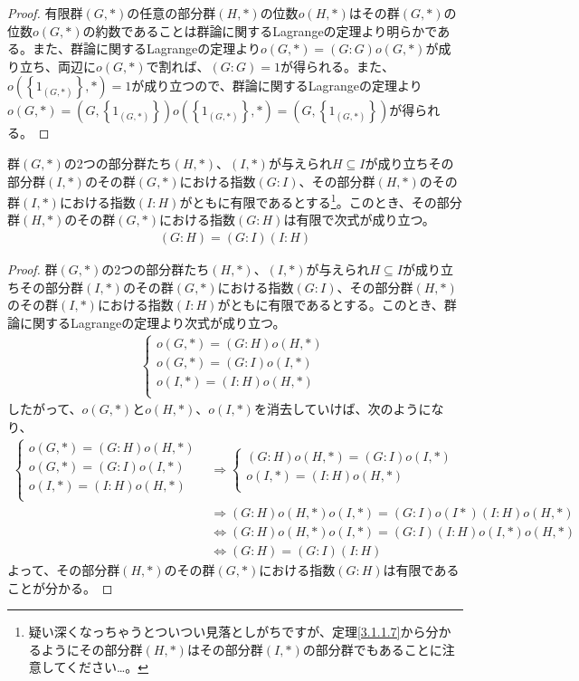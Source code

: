 \documentclass[dvipdfmx]{jsarticle}
\begin{document}
\begin{proof}
有限群$(G,*)$の任意の部分群$(H,*)$の位数$o(H,*)$はその群$(G,*)$の位数$o(G,*)$の約数であることは群論に関するLagrangeの定理より明らかである。また、群論に関するLagrangeの定理より$o(G,*) = (G:G)o(G,*)$が成り立ち、両辺に$o(G,*)$で割れば、$(G:G) = 1$が得られる。また、$o\left( \left\{ 1_{(G,*)} \right\},* \right) = 1$が成り立つので、群論に関するLagrangeの定理より$o(G,*) = \left( G,\left\{ 1_{(G,*)} \right\} \right)o\left( \left\{ 1_{(G,*)} \right\},* \right) = \left( G,\left\{ 1_{(G,*)} \right\} \right)$が得られる。
\end{proof}
\begin{thm}\label{3.1.1.36}
群$(G,*)$の2つの部分群たち$(H,*)$、$(I,*)$が与えられ$H \subseteq I$が成り立ちその部分群$(I,*)$のその群$(G,*)$における指数$(G:I)$、その部分群$(H,*)$のその群$(I,*)$における指数$(I:H)$がともに有限であるとする\footnote{疑い深くなっちゃうとついつい見落としがちですが、定理\ref{3.1.1.7}から分かるようにその部分群$(H,*)$はその部分群$(I,*)$の部分群でもあることに注意してください…。}。このとき、その部分群$(H,*)$のその群$(G,*)$における指数$(G:H)$は有限で次式が成り立つ。
\begin{align*}
(G:H) = (G:I)(I:H)
\end{align*}
\end{thm}
\begin{proof}
群$(G,*)$の2つの部分群たち$(H,*)$、$(I,*)$が与えられ$H \subseteq I$が成り立ちその部分群$(I,*)$のその群$(G,*)$における指数$(G:I)$、その部分群$(H,*)$のその群$(I,*)$における指数$(I:H)$がともに有限であるとする。このとき、群論に関するLagrangeの定理より次式が成り立つ。
\begin{align*}
\left\{ \begin{matrix}
o(G,*) = (G:H)o(H,*) \\
o(G,*) = (G:I)o(I,*) \\
o(I,*) = (I:H)o(H,*) \\
\end{matrix} \right.\ 
\end{align*}
したがって、$o(G,*)$と$o(H,*)$、$o(I,*)$を消去していけば、次のようになり、
\begin{align*}
\left\{ \begin{matrix}
o(G,*) = (G:H)o(H,*) \\
o(G,*) = (G:I)o(I,*) \\
o(I,*) = (I:H)o(H,*) \\
\end{matrix} \right. &\Rightarrow \left\{ \begin{matrix}
(G:H)o(H,*) = (G:I)o(I,*) \\
o(I,*) = (I:H)o(H,*) \\
\end{matrix} \right.\ \\
&\Rightarrow (G:H)o(H,*)o(I,*) = (G:I)o(I*)(I:H)o(H,*)\\
&\Leftrightarrow (G:H)o(H,*)o(I,*) = (G:I)(I:H)o(I,*)o(H,*)\\
&\Leftrightarrow (G:H) = (G:I)(I:H)
\end{align*}
よって、その部分群$(H,*)$のその群$(G,*)$における指数$(G:H)$は有限であることが分かる。
\end{proof}
\end{document}

